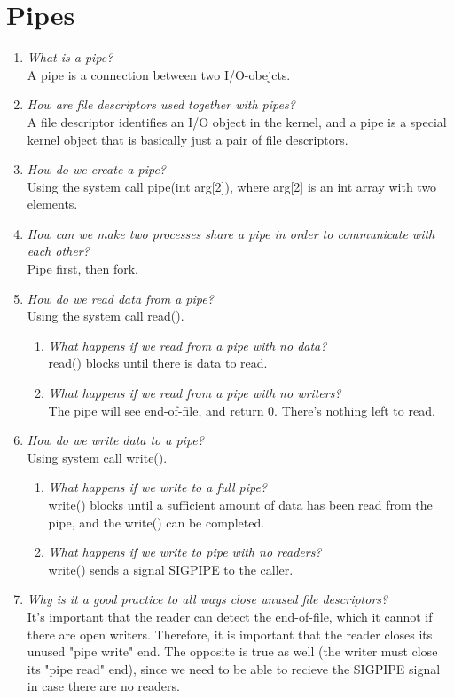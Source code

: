 \documentclass[a4paper]{article}
\begin{document}
\section{Pipes}
\begin{enumerate}
  \item \textit{What is a pipe?}\\
    A pipe is a connection between two I/O-obejcts. 
  \item \textit{How are file descriptors used together with pipes?}\\
    A file descriptor identifies an I/O object in the kernel, and a pipe is a special kernel object that is basically just a pair of file descriptors. 
  \item \textit{How do we create a pipe?}\\
   Using the system call pipe(int arg[2]), where arg[2] is an int array with two elements.
  \item \textit{How can we make two processes share a pipe in order to communicate with each other?}\\
    Pipe first, then fork.
  \item \textit{How do we read data from a pipe?}\\
    Using the system call read().
    \begin{enumerate}
    \item \textit{What happens if we read from a pipe with no data?}\\
      read() blocks until there is data to read.
    \item \textit{What happens if we read from a pipe with no writers?}\\
      The pipe will see end-of-file, and return 0. There's nothing left to read.
    \end{enumerate}
  \item \textit{How do we write data to a pipe?}\\
    Using system call write().
    \begin{enumerate}
    \item \textit{What happens if we write to a full pipe?}\\
      write() blocks until a sufficient amount of data has been read from the pipe, and the write() can be completed.
    \item \textit{What happens if we write to pipe with no readers?}\\
      write() sends a signal SIGPIPE to the caller.
    \end{enumerate}
  \item \textit{Why is it a good practice to all ways close unused file descriptors?}\\
    It's important that the reader can detect the end-of-file, which it cannot if there are open writers. Therefore, it is important that the reader closes its unused "pipe write" end.  
    The opposite is true as well (the writer must close its "pipe read" end), since we need to be able to recieve the SIGPIPE signal in case there are no readers. 
    
\end{enumerate}
\end{document}
